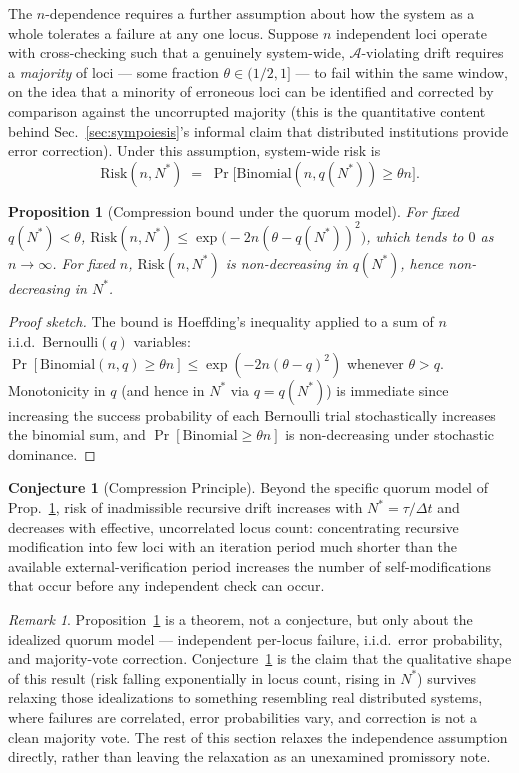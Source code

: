 \documentclass[11pt,a4paper]{article}
\theoremstyle{plain}
\newtheorem{proposition}[theorem]{Proposition}
\theoremstyle{definition}
\newtheorem{conjecture}[theorem]{Conjecture}
\theoremstyle{remark}
\newtheorem{remark}[theorem]{Remark}
\newcommand{\Adm}{\mathcal{A}}
\begin{document}
The $n$-dependence requires a further assumption about how the system as a whole tolerates a failure at any one locus. Suppose $n$ independent loci operate with cross-checking such that a genuinely system-wide, $\Adm$-violating drift requires a \emph{majority} of loci — some fraction $\theta \in (1/2, 1]$ — to fail within the same window, on the idea that a minority of erroneous loci can be identified and corrected by comparison against the uncorrupted majority (this is the quantitative content behind Sec.~\ref{sec:sympoiesis}'s informal claim that distributed institutions provide error correction). Under this assumption, system-wide risk is
\[
\mathrm{Risk}(n, N^\ast) \;=\; \Pr\!\big[\mathrm{Binomial}(n, q(N^\ast)) \ge \theta n\big].
\]

\begin{proposition}[Compression bound under the quorum model]
\label{prop:compression-bound}
For fixed $q(N^\ast) < \theta$, $\mathrm{Risk}(n,N^\ast) \le \exp\!\big(-2n(\theta - q(N^\ast))^2\big)$, which tends to $0$ as $n \to \infty$. For fixed $n$, $\mathrm{Risk}(n, N^\ast)$ is non-decreasing in $q(N^\ast)$, hence non-decreasing in $N^\ast$.
\end{proposition}

\begin{proof}[Proof sketch]
The bound is Hoeffding's inequality applied to a sum of $n$ i.i.d.\ Bernoulli$(q)$ variables: $\Pr[\mathrm{Binomial}(n,q)\ge \theta n] \le \exp(-2n(\theta-q)^2)$ whenever $\theta > q$. Monotonicity in $q$ (and hence in $N^\ast$ via $q=q(N^\ast)$) is immediate since increasing the success probability of each Bernoulli trial stochastically increases the binomial sum, and $\Pr[\text{Binomial} \ge \theta n]$ is non-decreasing under stochastic dominance.
\end{proof}

\begin{conjecture}[Compression Principle]
\label{conj:compression}
Beyond the specific quorum model of Prop.~\ref{prop:compression-bound}, risk of inadmissible recursive drift increases with $N^\ast = \tau/\Delta t$ and decreases with effective, uncorrelated locus count: concentrating recursive modification into few loci with an iteration period much shorter than the available external-verification period increases the number of self-modifications that occur before any independent check can occur.
\end{conjecture}

\begin{remark}
Proposition~\ref{prop:compression-bound} is a theorem, not a conjecture, but only about the idealized quorum model — independent per-locus failure, i.i.d.\ error probability, and majority-vote correction. Conjecture~\ref{conj:compression} is the claim that the qualitative shape of this result (risk falling exponentially in locus count, rising in $N^\ast$) survives relaxing those idealizations to something resembling real distributed systems, where failures are correlated, error probabilities vary, and correction is not a clean majority vote. The rest of this section relaxes the independence assumption directly, rather than leaving the relaxation as an unexamined promissory note.
\end{remark}
\end{document}
